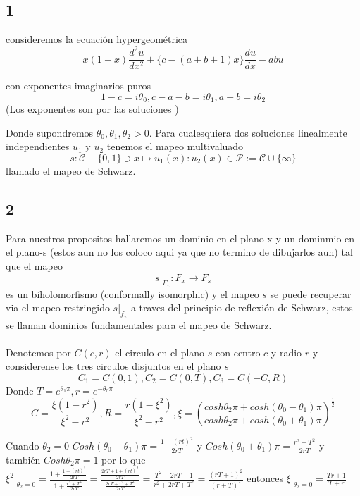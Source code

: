 \documentclass[11pt]{report}
\theoremstyle{definition}
\theoremstyle{remark}
\begin{document}
\chapter{}

\section{1}

consideremos la ecuaci\'on hypergeom\'etrica $$x(1-x)\frac{d^{2}u}{dx^{2}} +  \lbrace c- (a+b+1 )x \rbrace \frac{du}{dx} - abu $$

con exponentes imaginarios puros $$ 1-c = i\theta_{0}, c-a-b = i \theta_{1}, a-b=i\theta_{2}  $$ (Los exponentes son por las soluciones  )

Donde supondremos $\theta_{0}, \theta_{1} , \theta_{2} > 0$. Para cualesquiera dos soluciones linealmente independientes $u_{1}$ y $u_{2}$ tenemos el mapeo multivaluado $$s: \mathcal{C} -\lbrace0,1  \rbrace \ni x \mapsto u_{1}(x):u_{2}(x) \in \mathcal{P} := \mathcal{C} \cup \lbrace \infty \rbrace $$ llamado el mapeo de Schwarz.

\section{2}

Para nuestros propositos hallaremos un dominio en el plano-x y un dominmio en el plano-s (estos aun no los coloco aqui ya que no termino de dibujarlos aun) tal que el mapeo $$ s|_{F_{x}}: F_{x} \rightarrow F_{s}$$ es un biholomorfismo (conformally isomorphic) y el mapeo $s$ se puede recuperar via el mapeo restringido $s|_{f_{x}}$ a traves del principio de reflexi\'on de Schwarz, estos se llaman dominios fundamentales para el mapeo de Schwarz. \\ \\


Denotemos por $C(c,r)$ el circulo en el plano $s$ con centro $c$ y radio $r$ y considerense los tres circulos disjuntos en el plano $s$ $$ C_{1} = C(0,1), C_{2}=C(0,T), C_{3}= C(-C,R)$$ Donde $T=e^{\theta_{1} \pi}, r= e^{-\theta_{0} \pi}$ $$ C=\frac{\xi (1-r^{2})}{\xi^{2}-r^{2}},R=\frac{r(1-\xi^{2})}{\xi^{2}-r^{2}}, \xi =( \frac{cosh \theta_{2} \pi + cosh(\theta_{0}-\theta_{1}) \pi}{cosh \theta_{2} \pi + cosh(\theta_{0} + \theta_{1})\pi} )^{\frac{1}{2}}$$


Cuando $\theta_{2} = 0$  $Cosh (\theta_{0}-\theta_{1})\pi = \frac{1+(rt)^{2}}{2rT}$ y $Cosh( \theta_{0} + \theta_{1})\pi = \frac{r^{2} + T^{2}}{2rT}$  y tambi\'en $Cosh\theta_{2}\pi = 1 $ por lo que $\xi^{2}|_{\theta_{2}=0} = \frac{1 + \frac{1 + (rt)^{2}}{2rT}}{ 1 + \frac{r^{2 } + T^{2}}{2rT}} = \frac{\frac{2rT + 1 + (rt)^{2}}{2rT}}{\frac{2rT + r^{2} + T^{2}}{2rT}}= \frac{T^{2} + 2rT +1}{r^{2} + 2rT + T^{2}} = \frac{(rT  + 1)^{2}}{(r + T)^{2}}$ entonces $\xi|_{\theta_{2}=0} = \frac{Tr + 1}{ T +r}$
\end{document}
